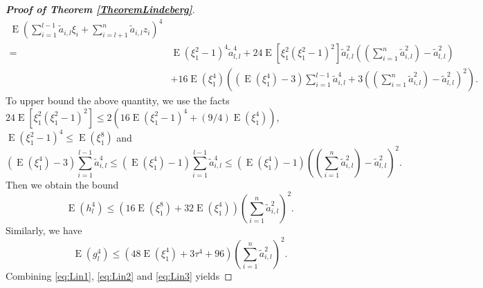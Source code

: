 \documentclass[11pt]{article}
\DeclareMathOperator{\myE}{E}
\theoremstyle{plain}
\theoremstyle{definition}
\theoremstyle{remark}
\begin{document}
\begin{appendices}
\begin{proof}[\textbf{Proof of Theorem \ref{TheoremLindeberg}}]
\begin{equation*}
\begin{split}
        \myE \left( 
        \sum_{i=1}^{l-1} \tilde a_{i,l} \xi_i 
        +\sum_{i =l +1}^n \tilde a_{i,l} z_i 
    \right)^4
    \\
    =&
        \myE (\xi_1^2 - 1)^4 \tilde a_{l,l}^4
        + 24 \myE [ \xi_1^2(\xi_1^2 -1)^2]
        \tilde a_{l,l}^2
    \left((\sum_{i=1}^n \tilde a_{i,l}^2) - \tilde a_{l,l}^2\right)
        \\
        &+
        16 \myE (\xi_1^4 )
    \left(
        \left(\myE (\xi_1^4) - 3\right)\sum_{i=1}^{l-1} \tilde a_{i,l}^4 
        + 3 \left( (\sum_{i=1}^n \tilde a_{i,l}^2) - \tilde a_{l,l}^2 \right)^2
    \right)
    .
    \end{split}
\end{equation*}
To upper bound the above quantity, we use the facts
$
24 \myE [ \xi_1^2(\xi_1^2 -1)^2]
\leq 
2(16\myE (\xi_1^2 -1)^4 + (9/4) \myE  (\xi_1^4) )
$,
$\myE (\xi_1^2 - 1)^4\leq \myE (\xi_1^8)$ and
\begin{equation*}
        \left(\myE (\xi_1^4) - 3\right)\sum_{i=1}^{l-1} \tilde a_{i,l}^4 
        \leq
        \left(\myE (\xi_1^4) - 1\right)\sum_{i=1}^{l-1} \tilde a_{i,l}^4 
        \leq
        \left(\myE (\xi_1^4) - 1\right)
        \left( (\sum_{i=1}^n \tilde a_{i,l}^2) - \tilde a_{l,l}^2 \right)^2
        .
\end{equation*}
Then we obtain the bound 
\begin{equation}\label{eq:Lin2}
\myE (h_l^4) \leq \left(16 \myE (\xi_1^8) + 32 \myE (\xi_1^4)\right) \left(\sum_{i=1}^n \tilde a_{i,l}^2\right)^2.
\end{equation}
Similarly, we have
\begin{equation}\label{eq:Lin3}
\myE (g_l^4) \leq \left(  48 \myE (\xi_1^4) + 3\tau^4 + 96 \right) \left(\sum_{i=1}^n \tilde a_{i,l}^2\right)^2.
\end{equation}
Combining \eqref{eq:Lin1}, \eqref{eq:Lin2} and \eqref{eq:Lin3} yields


\end{proof}
\end{appendices}
\end{document}
